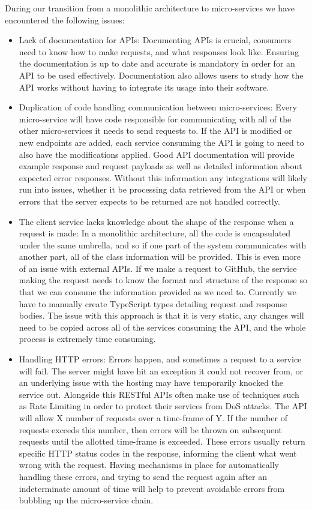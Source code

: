 During our transition from a monolithic architecture to micro-services we have encountered the following issues:
\begin{itemize}
  \item Lack of documentation for APIs: Documenting APIs is crucial, consumers need to know how to make requests, and what responses look like. Ensuring the documentation is up to date and accurate is mandatory in order for an API to be used effectively. Documentation also allows users to study how the API works without having to integrate its usage into their software. 
  \item Duplication of code handling communication between micro-services: Every micro-service will have code responsible for communicating with all of the other micro-services it needs to send requests to. If the API is modified or new endpoints are added, each service consuming the API is going to need to also have the modifications applied. Good API documentation will provide example response and request payloads as well as detailed information about expected error responses. Without this information any integrations will likely run into issues, whether it be processing data retrieved from the API or when errors that the server expects to be returned are not handled correctly. 
  \item The client service lacks knowledge about the shape of the response when a request is made: In a monolithic architecture, all the code is encapsulated under the same umbrella, and so if one part of the system communicates with another part, all of the class information will be provided. This is even more of an issue with external APIs. If we make a request to GitHub, the service making the request needs to know the format and structure of the response so that we can consume the information provided as we need to. Currently we have to manually create TypeScript types detailing request and response bodies. The issue with this approach is that it is very static, any changes will need to be copied across all of the services consuming the API, and the whole process is extremely time consuming.
  \item Handling HTTP errors: Errors happen, and sometimes a request to a service will fail. The server might have hit an exception it could not recover from, or an underlying issue with the hosting may have temporarily knocked the service out. Alongside this RESTful APIs often make use of techniques such as Rate Limiting in order to protect their services from DoS attacks. The API will allow X number of requests over a time-frame of Y. If the number of requests exceeds this number, then errors will be thrown on subsequent requests until the allotted time-frame is exceeded. 
  These errors usually return specific HTTP status codes in the response, informing the client what went wrong with the request. Having mechanisms in place for automatically handling these errors, and trying to send the request again after an indeterminate amount of time will help to prevent avoidable errors from bubbling up the micro-service chain.
\end{itemize}
